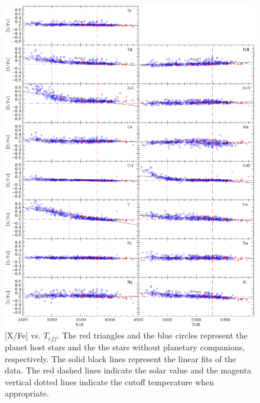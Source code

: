 \documentclass[dvips,12pt,a4paper]{report}
\begin{document}
{{\begin{figure}[h!]
\centering
\includegraphics[trim=0cm 1.5cm 0cm 1cm,clip,width=16cm]{pics/parte3/xfeteff.eps}
\caption[depois]{[X/Fe] vs. $T_{eff}$. The red triangles and the blue circles represent the planet host stars and the the stars without planetary companions, respectively. The solid black lines represent the linear fits of the data. The red dashed lines indicate the solar value and the magenta vertical dotted lines indicate the cutoff temperature when appropriate.}
\label{xfeteff}
\end{figure}
\begin{figure}[h!]
\centering

\end{figure}}}
\end{document}
